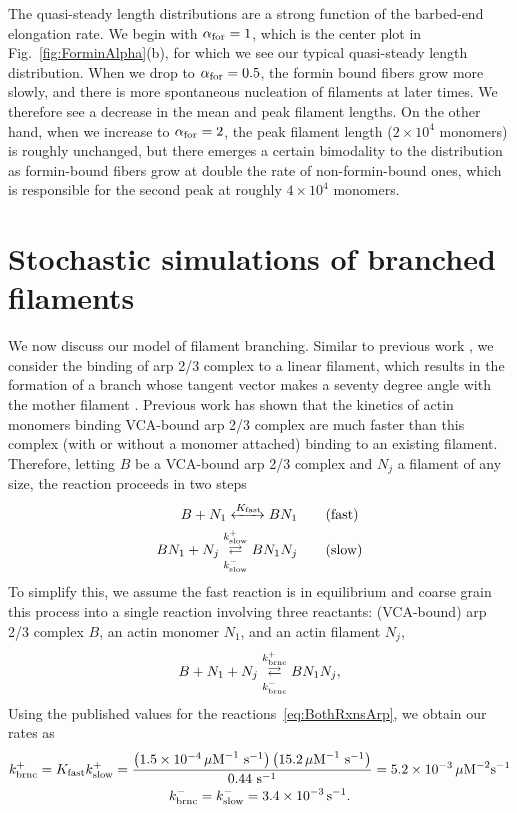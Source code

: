 \documentclass[11pt]{article}
\begin{document}
The quasi-steady length distributions are a strong function of the barbed-end elongation rate. We begin with $\alpha_\text{for}=1$, which is the center plot in Fig.\ \ref{fig:ForminAlpha}(b), for which we see our typical quasi-steady length distribution. When we drop to $\alpha_\text{for}=0.5$, the formin bound fibers grow more slowly, and there is more spontaneous nucleation of filaments at later times. We therefore see a decrease in the mean and peak filament lengths. On the other hand, when we increase to $\alpha_\text{for}=2$, the peak filament length ($2 \times 10^4$ monomers) is roughly unchanged, but there emerges a certain bimodality to the distribution as formin-bound fibers grow at double the rate of non-formin-bound ones, which is responsible for the second peak at roughly $4 \times 10^4$ monomers.

\section{Stochastic simulations of branched filaments \label{sec:BF}}
We now discuss our model of filament branching. Similar to previous work \cite{ni2019turnover}, we consider the binding of arp 2/3 complex to a linear filament, which results in the formation of a branch whose tangent vector makes a seventy degree angle with the mother filament \cite{pollard2007regulation}. Previous work \cite{beltzner2008pathway} has shown that the kinetics of actin monomers binding VCA-bound arp 2/3 complex are much faster than this complex (with or without a monomer attached) binding to an existing filament. Therefore, letting $B$ be a VCA-bound arp 2/3 complex and $N_j$ a filament of any size, the reaction proceeds in two steps
\begin{subequations}
\label{eq:BothRxnsArp}
\begin{align}
\label{eq:fastrxn}
B + N_1 \xleftrightarrow{K_\text{fast}} BN_1 \qquad & \text{(fast)}\\
BN_1 + N_j \overset{k_\text{slow}^+}{\underset{k_\text{slow}^-}\rightleftarrows} BN_1N_j \qquad & \text{(slow)}
\end{align}
\end{subequations}
To simplify this, we assume the fast reaction is in equilibrium and coarse grain this process into a single reaction involving three reactants: (VCA-bound) arp 2/3 complex $B$, an actin monomer $N_1$, and an actin filament $N_j$, 
\begin{equation}
\label{eq:ArpRxn}
B + N_1 + N_j \overset{k_\text{brnc}^+}{\underset{k_\text{brnc}^-}\rightleftarrows} BN_1N_j,
\end{equation}
Using the published values \cite{beltzner2008pathway} for the reactions\ \eqref{eq:BothRxnsArp}, we obtain our rates as 
\begin{gather*}
k_\text{brnc}^+ = K_\text{fast} k_\text{slow}^+=\frac{\left(1.5 \times 10^{-4} \, \mu\text{M}^{-1}\text{ s}^{-1}\right)\left(15.2 \, \mu\text{M}^{-1}\text{ s}^{-1}\right)}{0.44 \text{ s}^{-1}}=5.2 \times 10^{-3} \, \mu\text{M}^{-2}\text{s}^{-1}\\
k_\text{brnc}^- = k_\text{slow}^- = 3.4 \times 10^{-3} \, \text{s}^{-1}.
\end{gather*}
\end{document}
